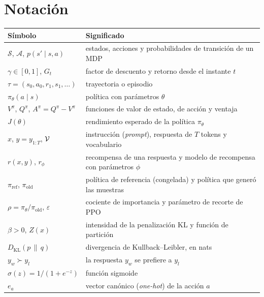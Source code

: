 \documentclass[11pt,a4paper,twoside,openany]{book}
\newcommand{\Sset}{\mathcal{S}}
\newcommand{\Aset}{\mathcal{A}}
\newcommand{\KL}{D_{\mathrm{KL}}}
\newcommand{\piref}{\pi_{\mathrm{ref}}}
\newcommand{\piold}{\pi_{\mathrm{old}}}
\newcommand{\pref}{\succ}
\begin{document}
\section*{Notación}
\begin{center}\small
\begin{tabularx}{\textwidth}{@{}l>{\raggedright\arraybackslash}X@{}}
\toprule
Símbolo & Significado \\
\midrule
$\Sset$, $\Aset$, $p(s'\mid s,a)$ & estados, acciones y probabilidades de transición de un MDP \\
$\gamma\in[0,1]$, $G_t$ & factor de descuento y retorno desde el instante $t$ \\
$\tau=(s_0,a_0,r_1,s_1,\dots)$ & trayectoria o episodio \\
$\pi_\theta(a\mid s)$ & política con parámetros $\theta$ \\
$V^{\pi}$, $Q^{\pi}$, $A^{\pi}=Q^{\pi}-V^{\pi}$ & funciones de valor de estado, de acción y ventaja \\
$J(\theta)$ & rendimiento esperado de la política $\pi_\theta$ \\
$x$, $y=y_{1:T}$, $\mathcal{V}$ & instrucción (\emph{prompt}), respuesta de $T$ tokens y vocabulario \\
$r(x,y)$, $r_\phi$ & recompensa de una respuesta y modelo de recompensa con parámetros $\phi$ \\
$\piref$, $\piold$ & política de referencia (congelada) y política que generó las muestras \\
$\rho=\pi_\theta/\piold$, $\varepsilon$ & cociente de importancia y parámetro de recorte de PPO \\
$\beta>0$, $Z(x)$ & intensidad de la penalización KL y función de partición \\
$\KL(p\,\|\,q)$ & divergencia de Kullback--Leibler, en nats \\
$y_w\pref y_l$ & la respuesta $y_w$ se prefiere a $y_l$ \\
$\sigma(z)=1/(1+e^{-z})$ & función sigmoide \\
$e_a$ & vector canónico (\emph{one-hot}) de la acción $a$ \\
\bottomrule
\end{tabularx}
\end{center}


\tableofcontents

\mainmatter







\backmatter

\end{document}
